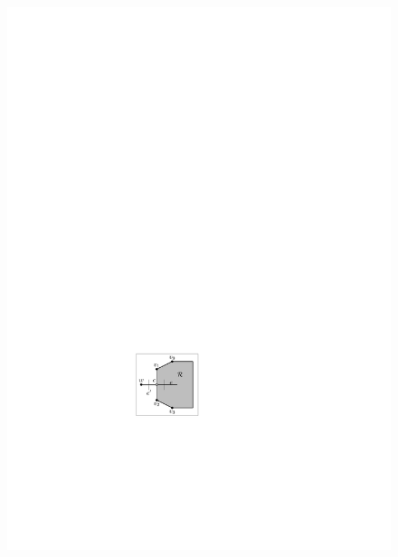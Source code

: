 \begin{figure}[htb]
    \centering
    \begin{minipage}[b]{.24\textwidth}
        \centering
        \includegraphics[width=\textwidth,page=1]{images/3planar_polygon}
        \subcaption{~}\label{fig:3_planar_polygon_before}
    \end{minipage}
    \begin{minipage}[b]{.24\textwidth}
        \centering

\end{minipage}
\end{figure}
